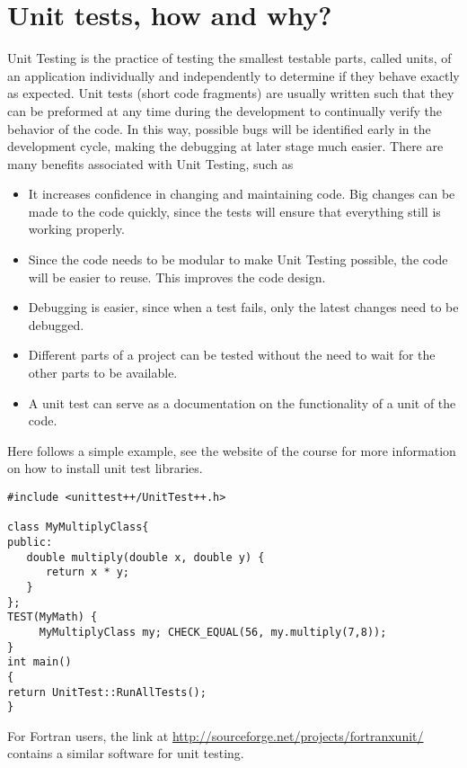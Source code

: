 \documentclass[10pt]{article}
\begin{document}
\section*{Unit tests, how and why?}
Unit Testing is the practice of testing the smallest testable parts, called units, of an application individually and independently to determine if they behave exactly as expected. Unit tests (short code fragments) are usually written such that they can be preformed at any time during the development to continually verify the behavior of the code. In this way, possible bugs will be identified early in the development cycle, making the debugging at later stage much easier. There are many benefits associated with Unit Testing, such as
\begin{itemize}
\item It increases confidence in changing and maintaining code. Big changes can be made to the code quickly, since the tests will ensure that everything still is working properly.
\item Since the code needs to be modular to make Unit Testing possible, the code will be easier to reuse. This improves the code design.
\item Debugging is easier, since when a test fails, only the latest changes need to be debugged.
\item Different parts of a project can be tested without the need to wait for the other parts to be available.
\item A unit test can serve as a documentation on the functionality of a unit of the code.
\end{itemize}
Here follows a simple example, see the website of the course for more information on how to install unit test libraries.
\begin{verbatim}
#include <unittest++/UnitTest++.h> 

class MyMultiplyClass{ 
public: 
   double multiply(double x, double y) { 
      return x * y; 
   } 
}; 
TEST(MyMath) { 
     MyMultiplyClass my; CHECK_EQUAL(56, my.multiply(7,8)); 
} 
int main() 
{ 
return UnitTest::RunAllTests(); 
}
\end{verbatim}
For Fortran users, the link at \url{http://sourceforge.net/projects/fortranxunit/} contains a similar software for unit testing.
\end{document}
